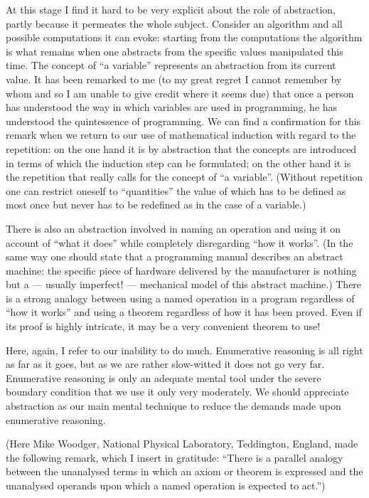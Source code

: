 At this stage I find it hard to be very explicit about the role of abstraction, partly because it permeates the whole subject. Consider an algorithm and all possible computations it can evoke: starting from the computations the algorithm is what remains when one abstracts from the specific values manipulated this time. The concept of ``a variable'' represents an abstraction from its current value. It has been remarked to me (to my great regret I cannot remember by whom and so I am unable to give credit where it seems due) that once a person has understood the way in which variables are used in programming, he has understood the quintessence of programming. We can find a confirmation for this remark when we return to our use of mathematical induction with regard to the repetition: on the one hand it is by abstraction that the concepts are introduced in terms of which the induction step can be formulated; on the other hand it is the repetition that really calls for the concept of ``a variable''. (Without repetition one can restrict oneself to ``quantities'' the value of which has to be defined as most once but never has to be redefined as in the case of a variable.)

There is also an abstraction involved in naming an operation and using it on account of ``what it does'' while completely disregarding ``how it works''. (In the same way one should state that a programming manual describes an abstract machine: the specific piece of hardware delivered by the manufacturer is nothing but a --- usually imperfect! --- mechanical model of this abstract machine.) There is a strong analogy between using a named operation in a program regardless of ``how it works'' and using a theorem regardless of how it has been proved. Even if its proof is highly intricate, it may be a very convenient theorem to use!

Here, again, I refer to our inability to do much. Enumerative reasoning is all right as far as it goes, but as we are rather slow-witted it does not go very
far. Enumerative reasoning is only an adequate mental tool under the severe boundary condition that we use it only very moderately. We should appreciate
abstraction as our main mental technique to reduce the demands made upon enumerative reasoning.

(Here Mike Woodger, National Physical Laboratory, Teddington, England, made the following remark, which I insert in gratitude: ``There is a parallel analogy between the unanalysed terms in which an axiom or theorem is expressed and the unanalysed operands upon which a named operation is expected to act.'')

